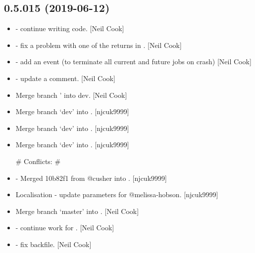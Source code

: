 \documentclass[a4paper,10pt,english]{report}
\begin{document}
\subsection{0.5.015 (2019-06-12)}
\label{\detokenize{misc/changelog:id121}}\begin{itemize}
\item {} 
 - continue writing code. {[}Neil Cook{]}

\item {} 
 - fix a problem with one of the returns in
. {[}Neil Cook{]}

\item {} 
 - add an event (to terminate all current and
future jobs on crash) {[}Neil Cook{]}

\item {} 
 - update a comment. {[}Neil Cook{]}

\item {} 
Merge branch ’ into dev. {[}Neil Cook{]}

\item {} 
Merge branch ‘dev’ into . {[}njcuk9999{]}

\item {} 
Merge branch ‘dev’ into . {[}njcuk9999{]}

\item {} 
Merge branch ‘dev’ into . {[}njcuk9999{]}

\# Conflicts:
\#    

\item {} 
 - Merged 10b82f1 from @cusher into . {[}njcuk9999{]}

\item {} 
Localisation - update parameters for @melissa-hobson. {[}njcuk9999{]}

\item {} 
Merge branch ‘master’ into . {[}Neil Cook{]}

\item {} 
 - continue work for . {[}Neil Cook{]}

\item {} 
 - fix backfile. {[}Neil Cook{]}


\end{itemize}
\end{document}
